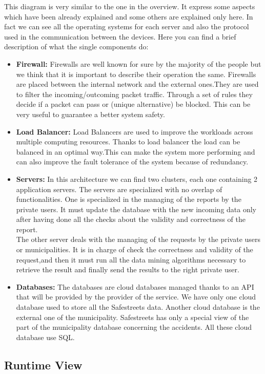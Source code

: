 \documentclass[titlepage]{article}
\begin{document}
This diagram is very similar to the one in the overview. It express some aspects which have been already explained and some others are explained only here. In fact we can see all the operating systems for each server and also the protocol used in the communication between the devices.
Here you can find a brief description of what the single components do:
\begin{itemize}
\item \textbf{Firewall:} Firewalls are well known for sure by the majority of the people but we think that it is important to describe their operation the same. Firewalls are placed between the internal network and the external ones.They are used to filter the incoming/outcoming packet traffic. Through a set of rules they decide if a packet can pass or (unique alternative) be blocked.  This can be very useful to guarantee a better system safety.
\item \textbf{Load Balancer:} Load Balancers are used to improve the workloads across multiple computing resources. Thanks to load balancer the load can be balanced in an optimal way.This can make the system more performing and can also improve the fault tolerance of the system because of redundancy.
\item \textbf{Servers:} In this architecture we can find two clusters, each one containing 2 application servers. The servers are specialized with no overlap of functionalities. One is specialized in the managing of the reports by the private users. It must update the database with the new incoming data only after having done all the checks about the validity and correctness of the report.\\
The other server deals with the managing of the requests by the private users or municipalities. It is in charge of check the correctness and validity of the request,and then it must run all the data mining algorithms necessary to retrieve the result and finally send the results to the right private user.
\item \textbf{Databases:} The databases are cloud databases managed thanks to an API that will be provided by the provider of the service. We have only one cloud database used to store all the Safestreets data. Another cloud database is the external one of the municipality. Safestreets has only a special view of the part of the municipality database concerning the accidents. All these cloud database use SQL.
\end{itemize}
\subsection{Runtime View}
\end{document}

